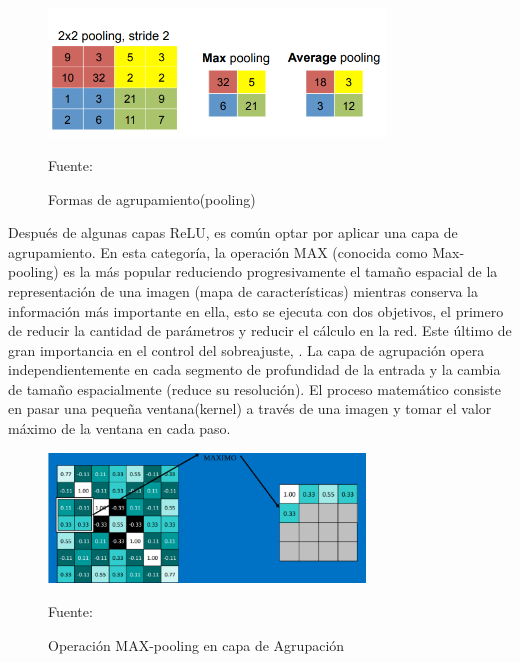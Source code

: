 		\begin{figure}[H]
		\begin{center}
		\includegraphics[width=0.8\textwidth]{images/marcoteorico/pooling}
		\end{center}
		\begin{center}
		\caption{\small{Formas de agrupamiento(pooling)}}
		\vskip -0.2cm  
		{\small{Fuente: \cite{caffe}}}
		\end{center}
		\vspace{-1.5em}
		\end{figure}

		Después de algunas capas ReLU, es común optar por aplicar una capa de agrupamiento. En esta categoría, la operación MAX (conocida como Max-pooling) es la más popular reduciendo progresivamente el tamaño espacial de la representación de una imagen (mapa de características) mientras conserva la información más importante en ella, esto se ejecuta con dos objetivos, el primero de reducir la cantidad de parámetros y reducir el cálculo en la red. Este último de gran importancia en el control del sobreajuste, \citep{Rohrer}.
		\vskip 0.4cm 
		La capa de agrupación opera independientemente en cada segmento de profundidad de la entrada y la cambia de tamaño espacialmente (reduce su resolución). El proceso matemático consiste en pasar una pequeña ventana(kernel) a través de una imagen y tomar el valor máximo de la ventana en cada paso. 


		\begin{figure}[H]
		\begin{center}
		\includegraphics[width=0.75\textwidth]{images/marcoteorico/pool1}
		\end{center}
		\begin{center}
		\caption{\small{Operación MAX-pooling en capa de Agrupación}}
		\vskip -0.2cm  
		{\small{Fuente: \cite{Rohrer}}}
		\end{center}
		\vspace{-1.5em}
		\end{figure}

